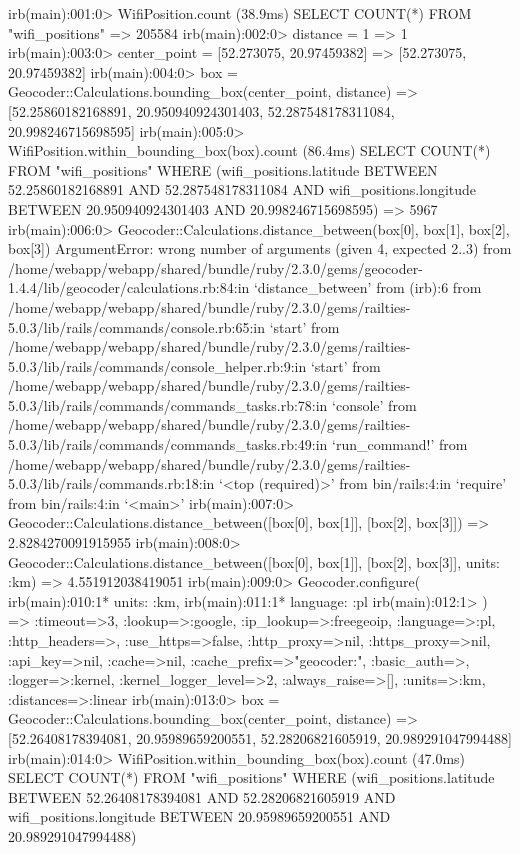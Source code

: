 irb(main):001:0> WifiPosition.count
   (38.9ms)  SELECT COUNT(*) FROM "wifi_positions"
=> 205584
irb(main):002:0> distance = 1
=> 1
irb(main):003:0> center_point = [52.273075, 20.97459382]
=> [52.273075, 20.97459382]
irb(main):004:0> box = Geocoder::Calculations.bounding_box(center_point, distance)
=> [52.25860182168891, 20.950940924301403, 52.287548178311084, 20.998246715698595]
irb(main):005:0> WifiPosition.within_bounding_box(box).count
   (86.4ms)  SELECT COUNT(*) FROM "wifi_positions" WHERE (wifi_positions.latitude BETWEEN 52.25860182168891 AND 52.287548178311084 AND wifi_positions.longitude BETWEEN 20.950940924301403 AND 20.998246715698595)
=> 5967
irb(main):006:0> Geocoder::Calculations.distance_between(box[0], box[1], box[2], box[3])
ArgumentError: wrong number of arguments (given 4, expected 2..3)
        from /home/webapp/webapp/shared/bundle/ruby/2.3.0/gems/geocoder-1.4.4/lib/geocoder/calculations.rb:84:in `distance_between'
        from (irb):6
        from /home/webapp/webapp/shared/bundle/ruby/2.3.0/gems/railties-5.0.3/lib/rails/commands/console.rb:65:in `start'
        from /home/webapp/webapp/shared/bundle/ruby/2.3.0/gems/railties-5.0.3/lib/rails/commands/console_helper.rb:9:in `start'
        from /home/webapp/webapp/shared/bundle/ruby/2.3.0/gems/railties-5.0.3/lib/rails/commands/commands_tasks.rb:78:in `console'
        from /home/webapp/webapp/shared/bundle/ruby/2.3.0/gems/railties-5.0.3/lib/rails/commands/commands_tasks.rb:49:in `run_command!'
        from /home/webapp/webapp/shared/bundle/ruby/2.3.0/gems/railties-5.0.3/lib/rails/commands.rb:18:in `<top (required)>'
        from bin/rails:4:in `require'
        from bin/rails:4:in `<main>'
irb(main):007:0> Geocoder::Calculations.distance_between([box[0], box[1]], [box[2], box[3]])
=> 2.8284270091915955
irb(main):008:0> Geocoder::Calculations.distance_between([box[0], box[1]], [box[2], box[3]], units: :km)
=> 4.551912038419051
irb(main):009:0> Geocoder.configure(
irb(main):010:1*   units: :km,
irb(main):011:1*   language: :pl
irb(main):012:1> )
=> {:timeout=>3, :lookup=>:google, :ip_lookup=>:freegeoip, :language=>:pl, :http_headers=>{}, :use_https=>false, :http_proxy=>nil, :https_proxy=>nil, :api_key=>nil, :cache=>nil, :cache_prefix=>"geocoder:", :basic_auth=>{}, :logger=>:kernel, :kernel_logger_level=>2, :always_raise=>[], :units=>:km, :distances=>:linear}
irb(main):013:0> box = Geocoder::Calculations.bounding_box(center_point, distance)
=> [52.26408178394081, 20.95989659200551, 52.28206821605919, 20.989291047994488]
irb(main):014:0> WifiPosition.within_bounding_box(box).count
   (47.0ms)  SELECT COUNT(*) FROM "wifi_positions" WHERE (wifi_positions.latitude BETWEEN 52.26408178394081 AND 52.28206821605919 AND wifi_positions.longitude BETWEEN 20.95989659200551 AND 20.989291047994488)
